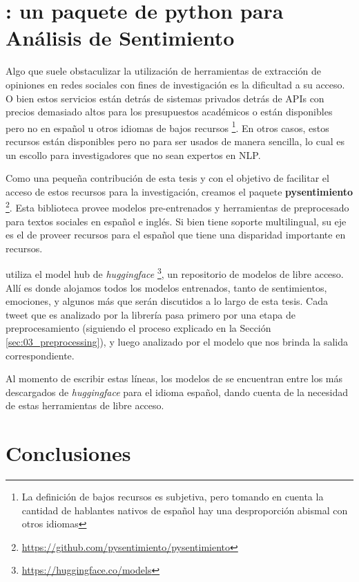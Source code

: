 \section{\pysentimiento: un paquete de python para Análisis de Sentimiento}


Algo que suele obstaculizar la utilización de herramientas de extracción de opiniones en redes sociales con fines de investigación es la dificultad a su acceso. O bien estos servicios están detrás de sistemas privados detrás de APIs con precios demasiado altos para los presupuestos académicos o están disponibles pero no en español u otros idiomas de bajos recursos \footnote{La definición de bajos recursos es subjetiva, pero tomando en cuenta la cantidad de hablantes nativos de español hay una desproporción abismal con otros idiomas}. En otros casos, estos recursos están disponibles pero no para ser usados de manera sencilla, lo cual es un escollo para investigadores que no sean expertos en NLP.

Como una pequeña contribución de esta tesis y con el objetivo de facilitar el acceso de estos recursos para la investigación, creamos el paquete \textbf{pysentimiento} \footnote{\url{https://github.com/pysentimiento/pysentimiento}}. Esta biblioteca provee modelos pre-entrenados y herramientas de preprocesado para textos sociales en español e inglés. Si bien tiene soporte multilingual, su eje es el de proveer recursos para el español que tiene una disparidad importante en recursos.

\pysentimiento{} utiliza el model hub de \emph{huggingface} \footnote{\url{https://huggingface.co/models}}, un repositorio de modelos de libre acceso. Allí es donde alojamos todos los modelos entrenados, tanto de sentimientos, emociones, y algunos más que serán discutidos a lo largo de esta tesis. Cada tweet que es analizado por la librería pasa primero por una etapa de preprocesamiento (siguiendo el proceso explicado en la Sección \ref{sec:03_preprocessing}), y luego analizado por el modelo que nos brinda la salida correspondiente.

Al momento de escribir estas líneas, los modelos de \pysentimiento{} se encuentran entre los más descargados de \emph{huggingface} para el idioma español, dando cuenta de la necesidad de estas herramientas de libre acceso.

%
%
%


\section{Conclusiones}

